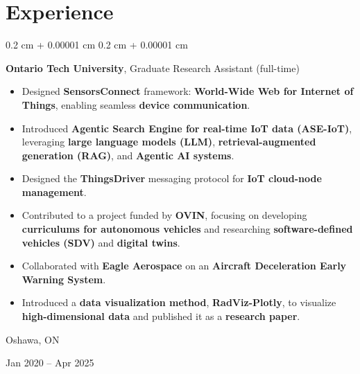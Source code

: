 \documentclass[10pt, letterpaper]{article}
\newenvironment{highlights}{
    \begin{itemize}[
        topsep=0.10 cm,
        parsep=0.10 cm,
        partopsep=0pt,
        itemsep=0pt,
        leftmargin=0.4 cm + 10pt
    ]
}{
    \end{itemize}
} %
\newenvironment{onecolentry}{
    \begin{adjustwidth}{
        0.2 cm + 0.00001 cm
    }{
        0.2 cm + 0.00001 cm
    }
}{
    \end{adjustwidth}
} %
\newenvironment{twocolentry}[2][]{
    \onecolentry
    \def\secondColumn{#2}
    \setcolumnwidth{\fill, 4.5 cm}
    \begin{paracol}{2}
}{
    \switchcolumn \raggedleft \secondColumn
    \end{paracol}
    \endonecolentry
} %
\let\hrefWithoutArrow\href
\renewcommand{\href}[2]{\hrefWithoutArrow{#1}{\ifthenelse{\equal{#2}{}}{ }{#2 }\raisebox{.15ex}{\footnotesize \faExternalLink*}}}
\begin{document}

\vspace{-0.2 cm}
\section{Experience}



        
        \begin{twocolentry}{
            Oshawa, ON

        Jan 2020 – Apr 2025
        }
            \textbf{Ontario Tech University}, Graduate Research Assistant (full-time)
            \begin{highlights}
            \item Designed \textbf{SensorsConnect} framework: \textbf{World-Wide Web for Internet of Things}, enabling seamless \textbf{device communication}.
            \item Introduced \textbf{Agentic Search Engine for real-time IoT data (ASE-IoT)}, leveraging \textbf{large language models (LLM)}, \textbf{retrieval-augmented generation (RAG)}, and \textbf{Agentic AI systems}.
            \item Designed the \textbf{ThingsDriver} messaging protocol for \textbf{IoT cloud-node management}.
            \item Contributed to a project funded by \textbf{OVIN}, focusing on developing \textbf{curriculums for autonomous vehicles} and researching \textbf{software-defined vehicles (SDV)} and \textbf{digital twins}.
            \item Collaborated with \textbf{Eagle Aerospace} on an \textbf{Aircraft Deceleration Early Warning System}.
            \item Introduced a \textbf{data visualization method}, \textbf{RadViz-Plotly}, to visualize \textbf{high-dimensional data} and published it as a \textbf{research paper}.
        \end{highlights}

        \end{twocolentry}


        \vspace{0.2 cm}
\end{document}
